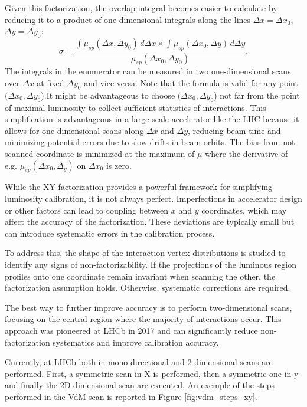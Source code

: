 Given this factorization, the overlap integral becomes easier to calculate by reducing it to a product of one-dimensional integrals  along the lines $\Delta x = \Delta x_0$, $\Delta y = \Delta y_0$:
\begin{equation}
\sigma = \frac{\int \mu _{sp}(\Delta x, \Delta y_0)\, d\Delta x \times \int \mu _{sp}(\Delta x_0, \Delta y)\, d\Delta y}{\mu _{sp}(\Delta x_0, \Delta y_0)}.
\end{equation}
The integrals in the enumerator can be measured in two one-dimensional scans over $\Delta x$ at fixed $\Delta y_0$ and vice versa. Note that the formula is valid for any point $(\Delta x_0, \Delta y_0$).It might be advantageous to choose $(\Delta x_0, \Delta y_0$) not far from the point of maximal luminosity to collect sufficient statistics of interactions. This simplification is advantageous in a large-scale accelerator like the LHC because it allows for one-dimensional scans along \(\Delta x\) and \(\Delta y\), reducing beam time and minimizing potential errors due to slow drifts in beam orbits. The bias from not scanned coordinate is minimized at the maximum of $\mu$ where the derivative of e.g. $\mu_{sp}(\Delta x_0, \Delta_y)$ on $\Delta x_0$ is zero.

While the XY factorization provides a powerful framework for simplifying luminosity calibration, it is not always perfect. Imperfections in accelerator design or other factors can lead to coupling between \(x\) and \(y\) coordinates, which may affect the accuracy of the factorization. These deviations are typically small but can introduce systematic errors in the calibration process.

To address this, the shape of the interaction vertex distributions is studied to identify any signs of non-factorizability. If the projections of the luminous region profiles onto one coordinate remain invariant when scanning the other, the factorization assumption holds. Otherwise, systematic corrections are required.

\sloppy The best way to further improve accuracy is to perform two-dimensional scans, focusing on the central region where the majority of interactions occur. This approach was pioneered at LHCb in 2017 and can significantly reduce non-factorization systematics and improve calibration accuracy\cite{Balagura_2021}.

Currently, at LHCb both in mono-directional and 2 dimensional scans are performed. First, a symmetric scan in X is performed, then a symmetric one in y and finally the 2D dimensional scan are executed. An exemple of the steps performed in the VdM scan is reported in Figure \ref{fig:vdm_steps_xy}.

